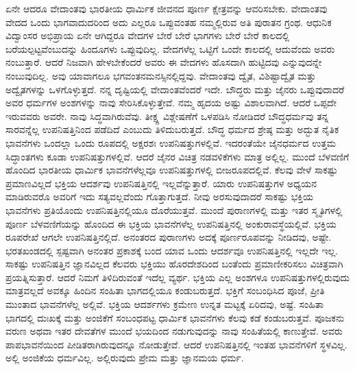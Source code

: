 ಏನೇ ಆದರೂ ವೇದಾಂತವು ಭಾರತೀಯ ಧಾರ್ಮಿಕ ಜೀವನದ ಪೂರ್ಣ ಕ್ಷೇತ್ರವನ್ನು ಆವರಿಸಬೇಕು. ವೇದಾಂತವು ವೇದದ ಒಂದು ಭಾಗವಾದುದರಿಂದ ಅದು ಎಲ್ಲರೂ ಒಪ್ಪುವಂತಹ ನಮ್ಮಲ್ಲಿರುವ ಅತಿ ಪುರಾತನ ಗ್ರಂಥ. ಆಧುನಿಕ ವಿದ್ವಾಂಸರ ಅಭಿಪ್ರಾಯ ಏನೇ ಆಗಿದ್ದರೂ ವೇದಗಳ ಬೇರೆ ಬೇರೆ ಭಾಗಗಳು ಬೇರೆ ಬೇರೆ ಕಾಲದಲ್ಲಿ ಬರೆಯಲ್ಪಟ್ಟವೆಂಬುದನ್ನು ಹಿಂದೂಗಳು ಒಪ್ಪುವುದಿಲ್ಲ. ವೇದಗಳೆಲ್ಲ ಒಟ್ಟಿಗೆ ಒಂದೇ ಕಾಲದಲ್ಲಿ ಆದುವೆಂದು ಅವರು ನಂಬುತ್ತಾರೆ. ಆದರೆ ನಿಜವಾಗಿ ಹೇಳಬೇಕೆಂದರೆ ಅವರು ಈ ವೇದಗಳು ಹೊಸದಾಗಿ ಹುಟ್ಟಿದವು ಎನ್ನುವುದನ್ನೇ ನಂಬುವುದಿಲ್ಲ. ಅವು ಯಾವಾಗಲೂ ಭಗವಂತನ\break ಮನಸ್ಸಿನಲ್ಲಿದ್ದವು. ವೇದಾಂತವು ದ್ವೈತ, ವಿಶಿಷ್ಟಾದ್ವೈತ ಮತ್ತು ಅದ್ವೈತಗಳನ್ನು ಒಳಗೊಳ್ಳುತ್ತದೆ. ನನ್ನ ದೃಷ್ಟಿಯಲ್ಲಿ ವೇದಾಂತವೆಂದರೆ ಇದೇ. ಬೌದ್ಧರು ಮತ್ತು ಜೈನರು ಒಪ್ಪುವುದಾದರೆ ಅವರ ಧರ್ಮಗಳ ಅಂಶಗಳನ್ನು ನಾವು ಸೇರಿಸಿಕೊಳ್ಳುತ್ತೇವೆ. ನಮ್ಮ ಹೃದಯ ಅಷ್ಟು ವಿಶಾಲವಾಗಿದೆ. ಆದರೆ ಒಪ್ಪದೇ ಇರುವವರು ಅವರೇ. ನಾವು ಸಿದ್ಧವಾಗಿರುವೆವು. ತೀಕ್ಷ್ಣ ವಿಶ್ಲೇಷಣೆಗೆ ಒಳಪಡಿಸಿ ನೋಡಿದರೆ ಬೌದ್ಧಧರ್ಮವು ತನ್ನ ಸಾರವನ್ನೆಲ್ಲ ಉಪನಿಷತ್ತಿನಿಂದ ಪಡೆದಿದೆ ಎಂಬುದು ತಿಳಿದುಬರುತ್ತದೆ. ಬೌದ್ಧ ಧರ್ಮದ ಶ್ರೇಷ್ಠ ಮತ್ತು ಅದ್ಭುತ ನೈತಿಕ ಭಾವನೆಗಳು ಒಂದಲ್ಲಾ ಒಂದು ರೂಪದಲ್ಲಿ ಅಕ್ಷರಶಃ ಉಪನಿಷತ್ತುಗಳಲ್ಲಿವೆ. ಇದರಂತೆಯೇ ಜೈನಧರ್ಮದ ಉತ್ತಮ ಸಿದ್ಧಾಂತಗಳು ಕೂಡಾ ಉಪನಿಷತ್ತುಗಳಲ್ಲಿವೆ. ಆದರೆ ಜೈನರ ವಿಚಿತ್ರ ನಡವಳಿಕೆಗಳು ಮಾತ್ರ ಅಲ್ಲಿಲ್ಲ. ಮುಂದೆ ಬೆಳವಣಿಗೆ ಹೊಂದಿದ ಭಾರತೀಯ ಧಾರ್ಮಿಕ ಭಾವನೆಗಳೆಲ್ಲವೂ ಉಪನಿಷತ್ತುಗಳಲ್ಲಿ ಬೀಜರೂಪದಲ್ಲಿವೆ. ಕೆಲವು ವೇಳೆ ಸಾಕಷ್ಟು ಪ್ರಮಾಣವಿಲ್ಲದೆ ಭಕ್ತಿಯ ಆದರ್ಶವು ಉಪನಿಷತ್ತಿನಲ್ಲಿ ಇಲ್ಲವೆನ್ನುತ್ತಾರೆ. ಯಾರು ಉಪನಿಷತ್ತುಗಳ ಅಧ್ಯಯನ ಮಾಡಿರುವರೊ ಅವರಿಗೆ ಇದು ಸತ್ಯವಲ್ಲವೆಂದು ಗೊತ್ತಾಗುತ್ತದೆ. ನೀವು ಅರಸು\-ವುದಾದರೆ ಸಾಕಷ್ಟು ಭಕ್ತಿಯ ಭಾವನೆಗಳು ಪ್ರತಿಯೊಂದು ಉಪನಿಷತ್ತಿನಲ್ಲಿಯೂ ದೊರೆಯುತ್ತವೆ. ಮುಂದೆ ಪುರಾಣಗಳಲ್ಲಿ ಮತ್ತು ಇತರ ಸ್ಮೃತಿಗಳಲ್ಲಿ ಪೂರ್ಣ ಬೆಳವಣಿಗೆಯನ್ನು ಹೊಂದಿದ ಈ ಭಕ್ತಿಯ ಭಾವನೆಗಳೆಲ್ಲ ಉಪನಿಷತ್ತಿನಲ್ಲಿ ಅಂಕುರಾವಸ್ಥೆಯಲ್ಲಿವೆ. ಭಕ್ತಿಯ ರೂಪರೇಖೆ ಆಗಲೇ ಉಪನಿಷತ್ತಿನಲ್ಲಿದೆ. ಅನಂತರದ ಪುರಾಣಗಳು ಅದಕ್ಕೆ ಪೂರ್ಣರೂಪವನ್ನು ನೀಡಿದವು, ಅಷ್ಟೇ. ಭರತಖಂಡದಲ್ಲಿ ಸ್ಪಷ್ಟವಾಗಿ ಅನಂತರ ಪ್ರಕಾಶಕ್ಕೆ ಬಂದ ಯಾವ ಒಂದು ಆದರ್ಶವೂ ಉಪನಿಷತ್ತಿನಲ್ಲಿ ಇಲ್ಲದೇ ಇಲ್ಲ. ಸಾಕಷ್ಟು ಉಪನಿಷತ್ತಿನ ಜ್ಞಾನವಿಲ್ಲದ ಕೆಲವರು ಭಕ್ತಿಯು ಹೊರದೇಶದಿಂದ ಬಂತೆಂದು ಪ್ರಮಾಣೀಕರಿಸಲು ವಿಚಿತ್ರವಾಗಿ ಪ್ರಯತ್ನಿಸುತ್ತಾರೆ. ಆದರೆ ನಿಮಗೆ ತಿಳಿದಿರುವಂತೆ ಇದೆಲ್ಲ ವ್ಯರ್ಥ. ಭಕ್ತಿಯ ಎಲ್ಲ ಅಂಶಗಳೂ ಉಪನಿಷತ್ತುಗಳಲ್ಲಿರುವುದು ಮಾತ್ರವಲ್ಲದೆ ಅವಕ್ಕೂ ಹಿಂದಿನ ಸಂಹಿತಾ ಭಾಗದಲ್ಲಿಯೂ ಕಂಡುಬರುತ್ತದೆ. ಭಕ್ತಿಗೆ ಸಂಬಂಧಿಸಿದ ಪೂಜೆ, ಪ್ರೀತಿ ಮುಂತಾದ ಭಾವನೆಗಳೆಲ್ಲ ಅಲ್ಲಿವೆ. ಭಕ್ತಿಯ ಆದರ್ಶಗಳು ಕ್ರಮೇಣ ಉನ್ನತ ಮಟ್ಟಕ್ಕೆ ಏರಿದವು, ಅಷ್ಟೆ. ಸಂಹಿತಾ ಭಾಗದಲ್ಲಿ ದುಃಖಕ್ಕೆ ಮತ್ತು ಅಂಜಿಕೆಗೆ ಸಂಬಂಧಪಟ್ಟ ಧಾರ್ಮಿಕ ಭಾವನೆಗಳು ಕೆಲವು ಕಡೆ ಕಂಡುಬರುತ್ತವೆ. ಪೂಜಕನು ವರುಣ ಅಥವಾ ಇತರ ದೇವತೆಗಳ ಮುಂದೆ ಭಯದಿಂದ ನಡುಗುವುದನ್ನು ನಾವು ಸಂಹಿತೆಯಲ್ಲಿ ಕಾಣುತ್ತೇವೆ. ಅವರು ಪಾಪಭಾವನೆಯಿಂದ ಪೀಡಿತರಾಗಿರುವುದನ್ನೂ ನೋಡುತ್ತೇವೆ. ಆದರೆ ಉಪನಿಷತ್ತಿನಲ್ಲಿ ಇಂತಹ ಭಾವನೆಗಳಿಗೆ ಸ್ಥಳವಿಲ್ಲ. ಅಲ್ಲಿ ಅಂಜಿಕೆಯ ಧರ್ಮವಿಲ್ಲ. ಅಲ್ಲಿರುವುದು ಪ್ರೇಮ ಮತ್ತು ಜ್ಞಾನಮಯ ಧರ್ಮ.

